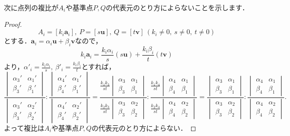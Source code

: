 \documentclass{jsarticle}
\theoremstyle{definition}
\numberwithin{theorem}{section}
\numberwithin{equation}{section}
\begin{document}
次に点列の複比が$A_i$や基準点$P,Q$の代表元のとり方によらないことを示します．
\begin{proof}
$$A_i=[k_i \bm{a}_i],\ P=[s\bm{u}],\ Q=[t\bm{v}] \ (k_i \neq 0,\ s\neq 0,\ t\neq 0)$$
とする．$\bm{a}_i=\alpha_i \bm{u}+ \beta_i \bm{v}$なので，
$$k_i \bm{a}_i=\frac{k_i \alpha_i}{s} (s\bm{u})+ \frac{k_i \beta_i}{t} (t\bm{v})$$
より，$\alpha'_i=\frac{k_i \alpha_i}{s},\ \beta'_i=\frac{k_i \beta_i}{t}$とすれば，
$$\frac{\begin{vmatrix}
\alpha_3' & \alpha_1'
\\ \beta_3' & \beta_1'
\end{vmatrix}}{\begin{vmatrix}
    \alpha_3' & \alpha_2'
\\ \beta_3' & \beta_2'
\end{vmatrix}}:\frac{\begin{vmatrix}
    \alpha_4' & \alpha_1'
\\ \beta_4' & \beta_1'
\end{vmatrix}}{\begin{vmatrix}
   \alpha_4' & \alpha_2'
\\ \beta_4' & \beta_2'
\end{vmatrix}}=\frac{\frac{k_1k_3}{st}\begin{vmatrix}
\alpha_3 & \alpha_1
\\ \beta_3 & \beta_1
\end{vmatrix}}{\frac{k_2k_3}{st}\begin{vmatrix}
    \alpha_3 & \alpha_2
\\ \beta_3 & \beta_2
\end{vmatrix}}:\frac{\frac{k_1k_4}{st}\begin{vmatrix}
    \alpha_4 & \alpha_1
\\ \beta_4 & \beta_1
\end{vmatrix}}{\frac{k_2k_4}{st}\begin{vmatrix}
   \alpha_4 & \alpha_2
\\ \beta_4 & \beta_2
\end{vmatrix}}=\frac{\begin{vmatrix}
\alpha_3 & \alpha_1
\\ \beta_3 & \beta_1
\end{vmatrix}}{\begin{vmatrix}
    \alpha_3 & \alpha_2
\\ \beta_3 & \beta_2
\end{vmatrix}}:\frac{\begin{vmatrix}
    \alpha_4 & \alpha_1
\\ \beta_4 & \beta_1
\end{vmatrix}}{\begin{vmatrix}
   \alpha_4 & \alpha_2
\\ \beta_4 & \beta_2
\end{vmatrix}}.$$
よって複比は$A_i$や基準点$P,Q$の代表元のとり方によらない．
\end{proof}
\end{document}
